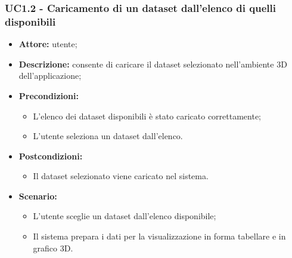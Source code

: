 \subsubsection{UC1.2 - Caricamento di un dataset dall'elenco di quelli disponibili}
\begin{itemize}
    \item \textbf{Attore:} utente;
    \item \textbf{Descrizione:} consente di caricare il dataset selezionato nell'ambiente 3D dell'applicazione;
    \item \textbf{Precondizioni:}
    \begin{itemize}
        \item L'elenco dei dataset disponibili è stato caricato correttamente;
        \item L'utente seleziona un dataset dall'elenco.
    \end{itemize}
    \item \textbf{Postcondizioni:}
    \begin{itemize}
        \item Il dataset selezionato viene caricato nel sistema.
    \end{itemize}
    \item \textbf{Scenario:}
    \begin{itemize}
        \item L'utente sceglie un dataset dall'elenco disponibile;
        \item Il sistema prepara i dati per la visualizzazione in forma tabellare e in grafico 3D.
    \end{itemize}
\end{itemize}
\newpage
